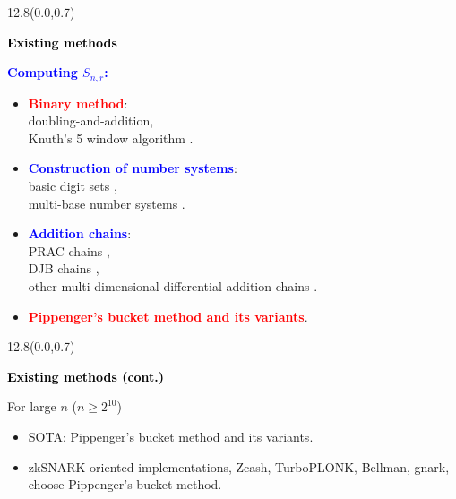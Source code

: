 \documentclass{beamer}                  %
\newcommand{\UW}[1]{\textbf{\textcolor{black}{#1}}}
\newcommand{\UWtitle}[1]{
	\begin{textblock}{12.8}(0.0,0.7)
		\begin{center} 
			\textbf{\UW{\Large{#1}}}
		\end{center}
	\end{textblock}
}
\newcommand{\fillframe}{\vspace*{10cm}}
\newcommand{\BL}[1]{\textcolor{blue}{\textbf{#1}}}
\newcommand{\RE}[1]{\textcolor{red}{\textbf{#1}}}
\begin{document}
\begin{frame}
\small
    \UWtitle{Existing methods}
    \BL{ Computing $S_{n,r}$:}
        \begin{itemize}
           \item<1-> \RE{Binary method}: \\
           doubling-and-addition, \\
           Knuth's 5 window algorithm \cite{knuth1997art, bos1989addition}.
           \item<2-> \BL{Construction of number systems}: \\
           basic digit sets \cite{matula1982basic, brickell1992fast},\\ 
           multi-base number systems \cite{doche2009double,suppakitpaisarn2012fastest, yu2013joint}.
           
           \item<3-> \BL{Addition chains}:  \\
           PRAC chains \cite{montgomery1992evaluating},\\
           DJB chains \cite{bernstein2006differential},\\
           other multi-dimensional differential addition chains \cite{brown2015multi,rao2015note}.
           
           \item<4-> \RE{Pippenger's bucket method and its variants}.
        \end{itemize}
\end{frame}

\begin{frame}
    \UWtitle{Existing methods (cont.)}
    \vspace*{2.5cm}
    \begin{block}{
 For large $n$ ($n\ge 2^{10}$)}
     
     \vspace{0.2in}
        \begin{itemize}
           \item 
           SOTA: Pippenger's bucket method and its variants.
           \vspace{0.2in}
           
           \item zkSNARK-oriented implementations, Zcash, TurboPLONK, Bellman, gnark, choose Pippenger's bucket method.
        \end{itemize}
        \end{block}
   \fillframe
\end{frame}
\end{document}
